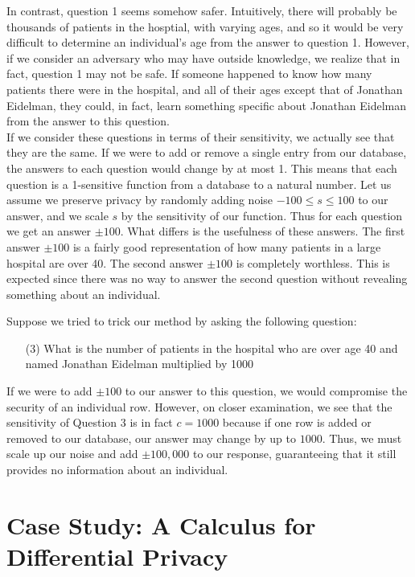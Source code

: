 \documentclass[11pt]{article}
\begin{document}
In contrast, question 1 seems somehow safer. Intuitively, there will probably be thousands of patients in the hosptial, with varying ages, and so it would be very difficult to determine an individual's age from the answer to question 1. However, if we consider an adversary who may have outside knowledge, we realize that in fact, question 1 may not be safe. If someone happened to know how many patients there were in the hospital, and all of their ages except that of Jonathan Eidelman, they could, in fact, learn something specific about Jonathan Eidelman from the answer to this question. \\

If we consider these questions in terms of their sensitivity, we actually see that they are the same. If we were to add or remove a single entry from our database, the answers to each question would change by at most 1. This means that each question is a 1-sensitive function from a database to a natural number. Let us assume we preserve privacy by randomly adding noise $-100 \leq s \leq 100$ to our answer, and we scale $s$ by the sensitivity of our function. Thus for each question we get an answer $\pm100$. What differs is the usefulness of these answers. The first answer $\pm100$ is a fairly good representation of how many patients in a large hospital are over 40. The second answer $\pm100$ is completely worthless. This is expected since there was no way to answer the second question without revealing something about an individual.

Suppose we tried to trick our method by asking the following question: \\

\begin{itemize}
\item[(3)] What is the number of patients in the hospital who are over age 40 and named Jonathan Eidelman multiplied by 1000
\end{itemize}

If we were to add $\pm100$ to our answer to this question, we would compromise the security of an individual row. However, on closer examination, we see that the sensitivity of Question 3 is in fact $c=1000$ because if one row is added or removed to our database, our answer may change by up to $1000$. Thus, we must scale up our noise and add $\pm100,000$ to our response, guaranteeing that it still provides no information about an individual.


\section{Case Study: A Calculus for Differential Privacy}
\end{document}
